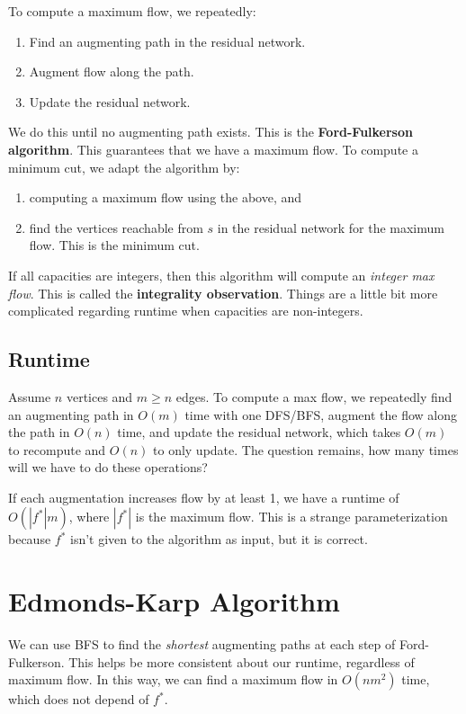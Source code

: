 \documentclass[titlepage, 12pt, leqno]{article}
\begin{document}
To compute a maximum flow, we repeatedly:
\begin{enumerate}
    \item Find an augmenting path in the residual network.
    \item Augment flow along the path.
    \item Update the residual network.
\end{enumerate}
We do this until no augmenting path exists. This is the \textbf{Ford-Fulkerson
algorithm}. This guarantees that we have a maximum flow. To compute a minimum
cut, we adapt the algorithm by:
\begin{enumerate}
    \item computing a maximum flow using the above, and
    \item  find the vertices reachable from $s$ in the residual network for the
        maximum flow. This is the minimum cut.
\end{enumerate}

\begin{note}
    If all capacities are integers, then this algorithm will compute an
    \textit{integer max flow}. This is called the \textbf{integrality 
    observation}. Things are a little bit more complicated regarding runtime
    when capacities are non-integers.
\end{note}

\subsection{Runtime}
Assume $n$ vertices and $m \ge n$ edges. To compute a max flow, we repeatedly
find an augmenting path in $O(m)$ time with one DFS/BFS, augment the flow along
the path in $O(n)$ time, and update the residual network, which takes $O(m)$ to
recompute and $O(n)$ to only update. The question remains, how many times will
we have to do these operations?

If each augmentation increases flow by at least 1, we have a runtime of 
$O(|f^{*}|m)$, where $|f^{*}|$ is the maximum flow. This is a strange
parameterization because $f^{*}$ isn't given to the algorithm as input, but it
is correct.

\pagebreak
\section{Edmonds-Karp Algorithm}
We can use BFS to find the \textit{shortest} augmenting paths at each step of
Ford-Fulkerson. This helps be more consistent about our runtime, regardless of
maximum flow. In this way, we can find a maximum flow in $O(nm^{2})$ time, 
which does not depend of $f^{*}$.
\end{document}
